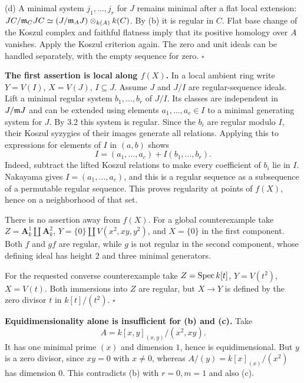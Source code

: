 \documentclass[11pt]{article}
\let\chapterexercise\exercise
\renewcommand{\exercise}[2]{\Needspace{8\baselineskip}\chapterexercise{#1}{#2}}
\begin{document}
(d) A minimal system $j_1,\ldots,j_r$ for $J$ remains minimal after a flat local extension: $JC/\mathfrak m_CJC\simeq(J/\mathfrak m_AJ)\otimes_{k(A)}k(C)$. By (b) it is regular in $C$. Flat base change of the Koszul complex and faithful flatness imply that its positive homology over $A$ vanishes. Apply the Koszul criterion again. The zero and unit ideals can be handled separately, with the empty sequence for zero. \hfill$\square$

\pf
\textbf{The first assertion is local along $f(X)$.} In a local ambient ring write $Y=V(I)$, $X=V(J)$, $I\subseteq J$. Assume $J$ and $J/I$ are regular-sequence ideals. Lift a minimal regular system $b_1,\ldots,b_r$ of $J/I$. Its classes are independent in $J/\mathfrak m J$ and can be extended using elements $a_1,\ldots,a_c\in I$ to a minimal generating system for $J$. By 3.2 this system is regular. Since the $b_i$ are regular modulo $I$, their Koszul syzygies of their images generate all relations. Applying this to expressions for elements of $I$ in $(a,b)$ shows
\[ I=(a_1,\ldots,a_c)+I(b_1,\ldots,b_r). \]
Indeed, subtract the lifted Koszul relations to make every coefficient of $b_i$ lie in $I$. Nakayama gives $I=(a_1,\ldots,a_c)$, and this is a regular sequence as a subsequence of a permutable regular sequence. This proves regularity at points of $f(X)$, hence on a neighborhood of that set.

There is no assertion away from $f(X)$. For a global counterexample take $Z=\mathbf A^1_k\amalg\mathbf A^2_k$, $Y=\{0\}\amalg V(x^2,xy,y^2)$, and $X=\{0\}$ in the first component. Both $f$ and $gf$ are regular, while $g$ is not regular in the second component, whose defining ideal has height $2$ and three minimal generators.

For the requested converse counterexample take $Z=\operatorname{Spec} k[t]$, $Y=V(t^2)$, $X=V(t)$. Both immersions into $Z$ are regular, but $X\to Y$ is defined by the zero divisor $t$ in $k[t]/(t^2)$. \hfill$\square$

\pf
\textbf{Equidimensionality alone is insufficient for (b) and (c).} Take
\[ A=k[x,y]_{(x,y)}/(x^2,xy). \]
It has one minimal prime $(x)$ and dimension $1$, hence is equidimensional. But $y$ is a zero divisor, since $xy=0$ with $x\ne0$, whereas $A/(y)=k[x]_{(x)}/(x^2)$ has dimension $0$. This contradicts (b) with $r=0,m=1$ and also (c).
\end{document}
